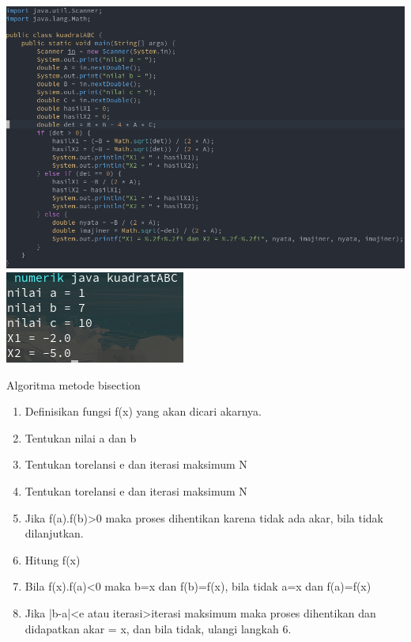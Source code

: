 \documentclass[a4paper,12pt]{article}
\begin{document}
   \begin{center}
      \includegraphics[scale=.5]{num04a.png} 
      \includegraphics[scale=.7]{num04b.png} 
   \end{center}

   \newpage
   Algoritma metode bisection
   \begin{enumerate}
      \item Definisikan fungsi f(x) yang akan dicari akarnya.
         \item Tentukan nilai a dan b
            \item Tentukan torelansi e dan iterasi maksimum N
               \item Tentukan torelansi e dan iterasi maksimum N
               \item Jika f(a).f(b)>0 maka proses dihentikan karena tidak ada akar, bila tidak dilanjutkan.
                  \item Hitung f(x)
                     \item Bila f(x).f(a)<0 maka b=x dan f(b)=f(x), bila tidak a=x dan f(a)=f(x)
                     \item Jika |b-a|<e atau iterasi>iterasi maksimum maka proses dihentikan dan didapatkan akar = x, dan bila tidak, ulangi langkah 6.
   \end{enumerate}

  
\end{document}

